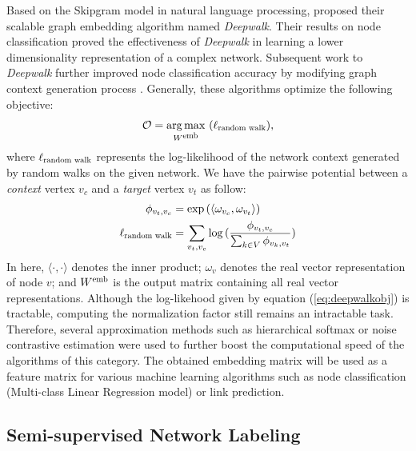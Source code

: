 \documentclass{article}
\DeclareMathOperator*{\argmax}{arg\,max}
\theoremstyle{definition}
\begin{document}
Based on the Skipgram model \cite{skipgram} in natural language
processing, \citeauthor{deepwalk} proposed their scalable graph embedding
algorithm named \emph{Deepwalk}. Their results on node classification proved the
effectiveness of \emph{Deepwalk} in learning a lower dimensionality
representation of a complex network. Subsequent work to \emph{Deepwalk} further
improved node classification accuracy by modifying graph context
generation process \cite{line,grarep,planetoid,node2vec}. Generally, these
algorithms optimize the following objective:
\begin{equation}
\mathcal{O} = \argmax_{W^{\scalebox{0.75}{emb}}}\ (
\ell_{\scalebox{0.75}{random walk}}),
\label{eq:deepwalkobj}
\end{equation}
where $\ell_{\scalebox{0.75}{random walk}}$ represents the log-likelihood
of the network context generated by random walks on the given network. We have
the pairwise potential between a \emph{context} vertex $v_c$ and a \emph{target}
vertex $v_t$ as follow:
\begin{equation}
\begin{aligned}
	\phi_{v_t,v_c} &= \exp{( \langle \omega_{v_c} ,  \omega_{v_t} \rangle )} \\
	\ell_{\scalebox{0.75}{random walk}} &= \sum_{v_t,v_c}
	\log{(\frac{\phi_{v_t,v_c}}{\sum_{k \in V} \phi_{v_k,v_t}})}
\end{aligned}
\label{eq:deepwalkprob}
\end{equation}
In here, $\langle \cdot , \cdot \rangle$ denotes the inner product; $\omega_v$
denotes the real vector representation of node $v$; and $W^{\scalebox{0.75}{emb}}$
is the output matrix containing all real vector representations. Although the
log-likehood given by equation (\ref{eq:deepwalkobj}) is tractable, computing the
normalization factor still remains an intractable task. Therefore, several
approximation methods such as hierarchical softmax \cite{hs,deepwalk} or noise
contrastive estimation \cite{nce,node2vec} were used to further boost the
computational speed of the algorithms of this category. The obtained embedding
matrix will be used as a feature matrix for various machine learning algorithms
such as node classification (Multi-class Linear Regression model) or link
prediction.

\subsection{Semi-supervised Network Labeling}
\end{document}
